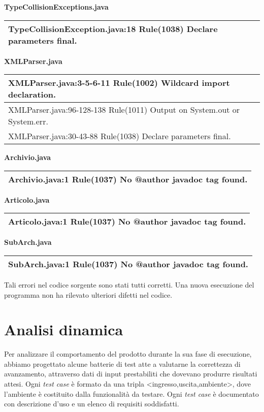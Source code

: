 \textbf{TypeCollisionExceptions.java}
\begin{center}
\begin{tabular}{|p{12cm}|} \hline
TypeCollisionException.java:18 Rule(1038) Declare parameters final.\\ \hline
\end{tabular}
\end{center}

\textbf{XMLParser.java}
\begin{center}
\begin{tabular}{|p{12cm}|} \hline
XMLParser.java:3-5-6-11 Rule(1002) Wildcard import declaration.\\ \hline
XMLParser.java:96-128-138 Rule(1011) Output on System.out or System.err.\\ \hline
XMLParser.java:30-43-88 Rule(1038) Declare parameters final.\\ \hline
\end{tabular}
\end{center}

\textbf{Archivio.java}
\begin{center}
\begin{tabular}{|p{12cm}|} \hline
Archivio.java:1 Rule(1037) No @author javadoc tag found.\\ \hline
\end{tabular}
\end{center}

\textbf{Articolo.java}
\begin{center}
\begin{tabular}{|p{12cm}|} \hline
Articolo.java:1 Rule(1037) No @author javadoc tag found.\\ \hline
\end{tabular}
\end{center}

\textbf{SubArch.java}
\begin{center}
\begin{tabular}{|p{12cm}|} \hline
SubArch.java:1 Rule(1037) No @author javadoc tag found.\\ \hline
\end{tabular}
\end{center}

Tali errori nel codice sorgente sono stati tutti corretti. Una nuova esecuzione del programma non ha rilevato ulteriori difetti nel codice.

\chapter{Analisi dinamica}
Per analizzare il comportamento del prodotto durante la sua fase di esecuzione, abbiamo progettato alcune batterie di test atte a valutarne la correttezza di avanzamento, attraverso dati di input prestabiliti che dovevano produrre risultati attesi.
Ogni \textit{test case} \`e formato da una tripla <ingresso,uscita,ambiente>, dove l'ambiente \`e costituito dalla funzionalit\`a da testare.
Ogni \textit{test case} \`e documentato con descrizione d'uso e un elenco di requisiti soddisfatti. 


